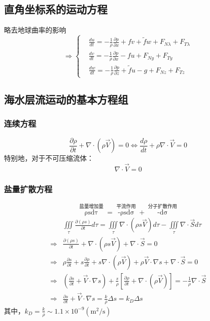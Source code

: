 \documentclass[a4paper,12pt]{article}
\begin{document}
    \subsection{直角坐标系的运动方程}
    略去地球曲率的影响
    \[
        \Rightarrow
        \boxed{
        \left\{
        \begin{aligned}
            &\frac{d u}{d t}=-\frac{1}{\rho} \frac{\partial p}{\partial x}+f v+\tilde{f} w+F_{N \lambda}+F_{T \lambda}\\
            &\frac{d v}{d t}=-\frac{1}{\rho} \frac{\partial p}{\partial x}-f u+F_{N y}+F_{T y}\\
            &\frac{d w}{d t}=-\frac{1}{\rho} \frac{\partial p}{\partial z}+\tilde{f} u-g+F_{N z}+F_{T z}
        \end{aligned}
        \right.
        }
    \]
    \subsection{海水层流运动的基本方程组}
    \subsubsection{连续方程}
    \[
        \frac{\partial \rho}{\partial t}+\nabla \cdot(\rho \vec{V})=0 \Leftrightarrow \frac{d \rho}{d t}+\rho \nabla \cdot \vec{V}=0
    \]
    特别地，对于不可压缩流体：
    \[
        \nabla \cdot \vec{V}=0
    \]
    \subsubsection{盐量扩散方程}
    \[
        \mathop{\frac{\partial}{\partial t} \iiint\limits_{\tau} \rho s d \tau}\limits^{\mbox{盐量增加量}}=\mathop{-\oiint\limits_{\sigma} \rho s V_{n} d \sigma}\limits^{\mbox{平流作用}}+\mathop{-\oiint\limits_{\sigma} S_{n} d \sigma}\limits^{\mbox{分子扩散作用}}
    \]
    \[
        \begin{aligned}
            &\iiint\limits_{\tau} \frac{\partial (\rho s)}{\partial t} d \tau =\iiint\limits_{\tau} \nabla \cdot(\rho s \vec{V}) d \tau -\iiint\limits_{\tau} \nabla \cdot \vec{S} d \tau \\
            \Rightarrow&\frac{\partial(\rho s)}{\partial t}+\nabla \cdot(\rho s \vec{V})+\nabla \cdot \vec{S}=0\\
            \Rightarrow&\rho \frac{\partial s}{\partial t}+s \frac{\partial \rho}{\partial t}+s \nabla \cdot(\rho \vec{V})+\rho \vec{V} \cdot \nabla s+\nabla \cdot \vec{S}=0\\
            \Rightarrow&\left(\frac{\partial s}{\partial t}+\vec{V} \cdot \nabla s\right)+\frac{s}{\rho}\left[\frac{\partial \rho}{\partial t}+\nabla \cdot(\rho \vec{V})\right]=-\frac{1}{\rho} \nabla \cdot \vec{S}\\
            \Rightarrow&\frac{\partial s}{\partial t}+\vec{V} \cdot \nabla s=\frac{k}{\rho} \Delta s=k_{D} \Delta s
        \end{aligned}
    \]
    其中，$\displaystyle k_{D}=\frac{k}{\rho} \sim 1.1 \times 10^{-9}\left(\mathrm{m}^{2} / \mathrm{s}\right)$
\end{document}
